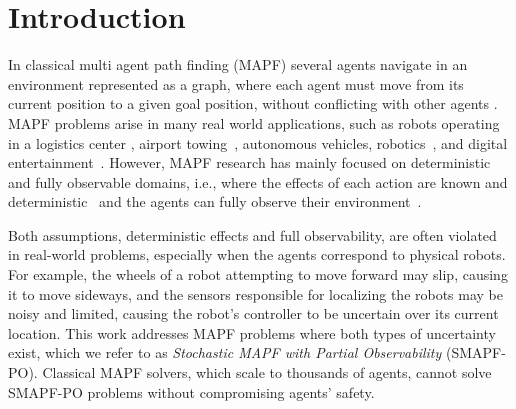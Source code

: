\documentclass[letterpaper]{article} %
\newcommand{\plan}[1]{{\textcolor{blue}{[Plan: #1]}}}
\newcommand{\inon}[1]{ }
\begin{document}
\section{Introduction}

In classical multi agent path finding (MAPF) several agents navigate in an environment represented as a graph, where each agent must move from its current position to a given goal position, without conflicting with other agents \cite{stern2019mapf}.
MAPF problems arise in many real world applications, such as robots operating in a logistics center \cite{wurman2008coordinating,salzman2020research}, airport towing~\cite{morris2016planning}, autonomous vehicles, robotics~\cite{veloso2015cobots}, and digital entertainment~\cite{ma2017feasibility}.
However, MAPF research has mainly focused on deterministic and fully observable domains, i.e., where the effects of each action are known and deterministic~\cite{SHARON201540,m-star,stern2019mapf} and the agents can fully observe their environment~\cite{wagner2017path,melchior2007particle,gonzalez2005planning}. 

Both assumptions, deterministic effects and full observability, are often violated in real-world problems, especially when the agents correspond to physical robots. For example, the wheels of a robot attempting to move forward may slip, causing it to move sideways, and the sensors responsible for localizing the robots may be noisy and limited, causing the robot's controller to be uncertain over its current location. 
This work addresses MAPF problems where both types of uncertainty exist, which we refer to as \emph{Stochastic MAPF with Partial Observability} (SMAPF-PO). 
Classical MAPF solvers, which scale to thousands of agents, cannot solve SMAPF-PO problems without compromising agents' safety.  



\end{document}
